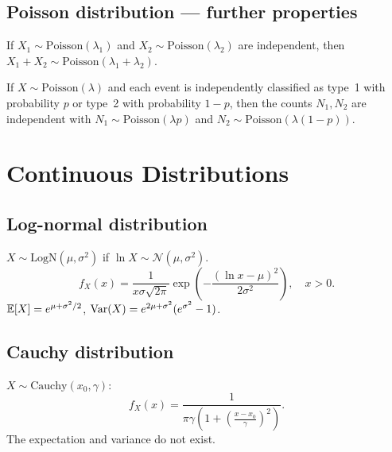 \subsection{Poisson distribution --- further properties}

\begin{proposition}
If $X_1 \sim \mathrm{Poisson}(\lambda_1)$ and $X_2 \sim \mathrm{Poisson}(\lambda_2)$
are independent, then $X_1 + X_2 \sim \mathrm{Poisson}(\lambda_1+\lambda_2)$.
\end{proposition}

\begin{proposition}
If $X \sim \mathrm{Poisson}(\lambda)$ and each event is independently classified
as type~1 with probability $p$ or type~2 with probability $1-p$, then the counts
$N_1, N_2$ are independent with $N_1 \sim \mathrm{Poisson}(\lambda p)$ and
$N_2 \sim \mathrm{Poisson}(\lambda(1-p))$.
\end{proposition}

\section{Continuous Distributions}

\subsection{Log-normal distribution}

\begin{definition}
$X \sim \mathrm{LogN}(\mu, \sigma^2)$ if $\ln X \sim \mathcal{N}(\mu, \sigma^2)$.
\[
    f_X(x) = \frac{1}{x\sigma\sqrt{2\pi}}
    \exp\!\left(-\frac{(\ln x - \mu)^2}{2\sigma^2}\right), \quad x > 0.
\]
$\mathbb{E}[X] = e^{\mu+\sigma^2/2}$, $\mathrm{Var}(X) = e^{2\mu+\sigma^2}(e^{\sigma^2}-1)$.
\end{definition}

\subsection{Cauchy distribution}

\begin{definition}[Cauchy]
$X \sim \mathrm{Cauchy}(x_0, \gamma)$:
\[
    f_X(x) = \frac{1}{\pi\gamma\left(1 + \left(\frac{x-x_0}{\gamma}\right)^2\right)}.
\]
The expectation and variance do not exist.
\end{definition}


